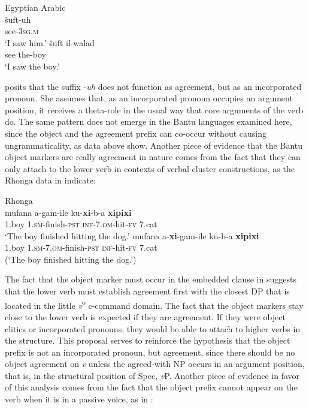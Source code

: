 \documentclass[output=paper]{langsci/langscibook}
\begin{document}
\ea\label{ex:nguna:24} {Egyptian Arabic}\\
\ea
\gll šuft-uh\\
     see-\textsc{3sg.m}\\
\glt ‘I saw him.’
\ex\label{ex:nguna:}
\gll šuft           il-walad\\
     see           the-boy\\
\glt ‘I saw the boy.’
\z
\z

\citet{Jelinek1989} posits that the suffix -{\textit{uh}} does not function as agreement, but as an incorporated pronoun. She assumes that, as an incorporated pronoun occupies an argument position, it receives {a theta}-role in the usual way that core arguments of the verb do. The same pattern does not emerge in the Bantu languages examined here, since the object and the agreement prefix can co-occur without causing ungrammaticality, as data above show. Another piece of evidence that the Bantu object markers are really agreement in nature comes from the fact that they can only attach to the lower verb in contexts of verbal cluster constructions, as the Rhonga data in  indicate:


\ea\label{ex:nguna:25}
{Rhonga}\\
\ea
\gll mufana         a-gam-ile                ku-\textbf{xi}-b-a                   \textbf{xipixi}\\
     1.boy           1.\textsc{sm}-finish-\textsc{pst}        \textsc{inf}-7.\textsc{om}-hit-\textsc{fv}        7.cat\\
\glt ‘The boy finished hitting the dog.’
\ex\label{ex:nguna:}
\gll *mufana       a-\textbf{xi}-gam-ile                      ku-b-a            \textbf{xipixi}\\
     1.boy           \textsc{1.sm-7.om}-finish-\textsc{pst}         \textsc{inf}-hit-\textsc{fv}      7.cat\\
\glt (‘The boy finished hitting the dog.’)
\z
\z

The fact that the object marker must occur in the embedded clause in  suggests that the lower verb must establish agreement first with the closest DP that is located in the little {\textit{v}}{\textsuperscript{o}} c-command domain. The fact that the object markers stay close to the lower verb is expected if they are agreement. If they were object clitics or incorporated pronouns, they would be able to attach to higher verbs in the structure. This proposal serves to reinforce the hypothesis that the object prefix is not an incorporated pronoun, but agreement, since there should be no object agreement on {\textit{v}} unless the agreed-with NP occurs in an argument position, that is, in the structural position of  Spec, {\textit{v}}P. Another piece of evidence in favor of this analysis comes from the fact that the object prefix cannot appear on the verb when it is in a passive voice, as in :
\end{document}
